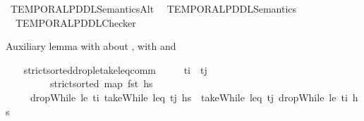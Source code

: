%
\begin{isabellebody}%
%
%
\isadelimdocument
%
\endisadelimdocument
%
\isatagdocument
%
\isamarkuptrue%
%
\endisatagdocument
{\isafolddocument}%
%
\isadelimdocument
%
\endisadelimdocument
%
\isadelimtheory
%
\endisadelimtheory
%
\isatagtheory
{}\isamarkupfalse%
\ TEMPORAL{\isacharunderscore}{\kern0pt}PDDL{\isacharunderscore}{\kern0pt}Semantics{\isacharunderscore}{\kern0pt}Alt\isanewline
{}\isanewline
\ \ TEMPORAL{\isacharunderscore}{\kern0pt}PDDL{\isacharunderscore}{\kern0pt}Semantics\isanewline
\ \ TEMPORAL{\isacharunderscore}{\kern0pt}PDDL{\isacharunderscore}{\kern0pt}Checker\ \isanewline
{}%
\endisatagtheory
{\isafoldtheory}%
%
\isadelimtheory
%
\endisadelimtheory
%
\begin{isamarkuptext}%
Auxiliary lemma with about ,  
  with  and %
\end{isamarkuptext}\isamarkuptrue%
\ \ \isamarkupfalse%
\ strict{\isacharunderscore}{\kern0pt}sorted{\isacharunderscore}{\kern0pt}drop{\isacharunderscore}{\kern0pt}le{\isacharunderscore}{\kern0pt}take{\isacharunderscore}{\kern0pt}leq{\isacharunderscore}{\kern0pt}comm{\isacharcolon}{\kern0pt}\isanewline
\ \ \ \ \ {\isachardoublequoteopen}t\isactrlsub i\ {\isasymle}\ t\isactrlsub j{\isachardoublequoteclose}\ \isanewline
\ \ \ \ \ \ \ \ \ {\isachardoublequoteopen}strict{\isacharunderscore}{\kern0pt}sorted\ {\isacharparenleft}{\kern0pt}map\ fst\ hs{\isacharparenright}{\kern0pt}{\isachardoublequoteclose}\isanewline
\ \ \ \ \ {\isachardoublequoteopen}dropWhile\ {\isacharparenleft}{\kern0pt}le\ t\isactrlsub i{\isacharparenright}{\kern0pt}\ {\isacharparenleft}{\kern0pt}takeWhile\ {\isacharparenleft}{\kern0pt}leq\ t\isactrlsub j{\isacharparenright}{\kern0pt}\ hs{\isacharparenright}{\kern0pt}\ {\isacharequal}{\kern0pt}\ takeWhile\ {\isacharparenleft}{\kern0pt}leq\ t\isactrlsub j{\isacharparenright}{\kern0pt}\ {\isacharparenleft}{\kern0pt}dropWhile\ {\isacharparenleft}{\kern0pt}le\ t\isactrlsub i{\isacharparenright}{\kern0pt}\ hs{\isacharparenright}{\kern0pt}{\isachardoublequoteclose}\isanewline
%
\isadelimproof
\ \ \ \ %
\endisadelimproof
%
\isatagproof
{}\isamarkupfalse%

\end{isabellebody}

